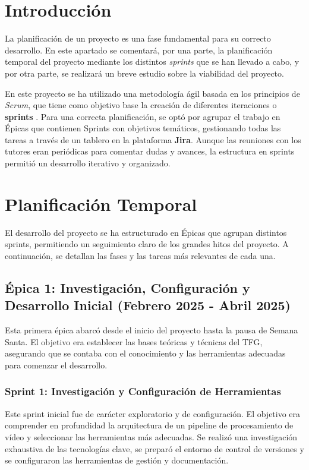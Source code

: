 \label{apendice:plan_proyecto}

\section{Introducción}
\label{sec:plan_intro}

La planificación de un proyecto es una fase fundamental para su correcto desarrollo. En este apartado se comentará, por una parte, la planificación temporal del proyecto mediante los distintos \textit{sprints} que se han llevado a cabo, y por otra parte, se realizará un breve estudio sobre la viabilidad del proyecto.

En este proyecto se ha utilizado una metodología ágil basada en los principios de \textit{Scrum}, que tiene como objetivo base la creación de diferentes iteraciones o \textbf{sprints} \cite{trigas2012metodologia}. Para una correcta planificación, se optó por agrupar el trabajo en Épicas que contienen Sprints con objetivos temáticos, gestionando todas las tareas a través de un tablero en la plataforma \textbf{Jira}. Aunque las reuniones con los tutores eran periódicas para comentar dudas y avances, la estructura en sprints permitió un desarrollo iterativo y organizado.


\section{Planificación Temporal}
\label{sec:plan_temporal}
El desarrollo del proyecto se ha estructurado en Épicas que agrupan distintos sprints, permitiendo un seguimiento claro de los grandes hitos del proyecto. A continuación, se detallan las fases y las tareas más relevantes de cada una.


\subsection{Épica 1: Investigación, Configuración y Desarrollo Inicial (Febrero 2025 - Abril 2025)}
\label{epic:1}
Esta primera épica abarcó desde el inicio del proyecto hasta la pausa de Semana Santa. El objetivo era establecer las bases teóricas y técnicas del TFG, asegurando que se contaba con el conocimiento y las herramientas adecuadas para comenzar el desarrollo.

\subsubsection{Sprint 1: Investigación y Configuración de Herramientas}
Este sprint inicial fue de carácter exploratorio y de configuración. El objetivo era comprender en profundidad la arquitectura de un pipeline de procesamiento de vídeo y seleccionar las herramientas más adecuadas. Se realizó una investigación exhaustiva de las tecnologías clave, se preparó el entorno de control de versiones y se configuraron las herramientas de gestión y documentación.


